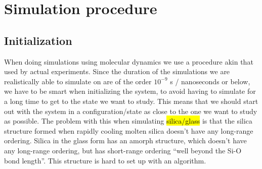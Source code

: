 \chapter{Simulation procedure}
\section{Initialization\label{sec:experimental_procedure}}
When doing simulations using molecular dynamics we use a procedure akin that used by actual experiments. Since the duration of the simulations we are realistically able to simulate on are of the order $10^{-9}$ s / nanoseconds or below, we have to be smart when initializing the system, to avoid having to simulate for a long time to get to the state we want to study. This means that we should start out with the system in a configuration/state as close to the one we want to study as possible. The problem with this when simulating \hl{silica/glass} is that the silica structure formed when rapidly cooling molten silica doesn't have any long-range ordering. Silica in the glass form has an amorph structure, which doesn't have any long-range ordering, but has short-range ordering ``well beyond the Si-O bond length''. This structure is hard to set up with an algorithm.
%
%         
%         

